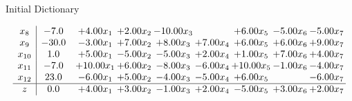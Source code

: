 \documentclass[8pt]{article}
\begin{document}
Initial Dictionary 

\[\begin{array}{c| c c@{\hskip 2pt} c@{\hskip 2pt} c@{\hskip 2pt} c@{\hskip 2pt} c@{\hskip 2pt} c@{\hskip 2pt} c@{\hskip 2pt} }
 x_{8}   &  -7.0 & +  4.00 x_{1} & +  2.00 x_{2} & -10.00 x_{3} &   & +  6.00 x_{5} & -5.00 x_{6} & -5.00 x_{7}\\
 x_{9}   &  -30.0 & -3.00 x_{1} & +  7.00 x_{2} & +  8.00 x_{3} & +  7.00 x_{4} & +  6.00 x_{5} & +  6.00 x_{6} & +  9.00 x_{7}\\
 x_{10}   &  1.0 & +  5.00 x_{1} & -5.00 x_{2} & -5.00 x_{3} & +  2.00 x_{4} & +  1.00 x_{5} & +  7.00 x_{6} & +  4.00 x_{7}\\
 x_{11}   &  -7.0 & + 10.00 x_{1} & +  6.00 x_{2} & -8.00 x_{3} & -6.00 x_{4} & + 10.00 x_{5} & -1.00 x_{6} & -4.00 x_{7}\\
 x_{12}   &  23.0 & -6.00 x_{1} & +  5.00 x_{2} & -4.00 x_{3} & -5.00 x_{4} & +  6.00 x_{5} &   & -6.00 x_{7}\\
\hline
z    &  0.0 & +  4.00 x_{1} & +  3.00 x_{2} & -1.00 x_{3} & +  2.00 x_{4} & -5.00 x_{5} & +  3.00 x_{6} & +  2.00 x_{7}\\
\end{array}\]
\end{document}
